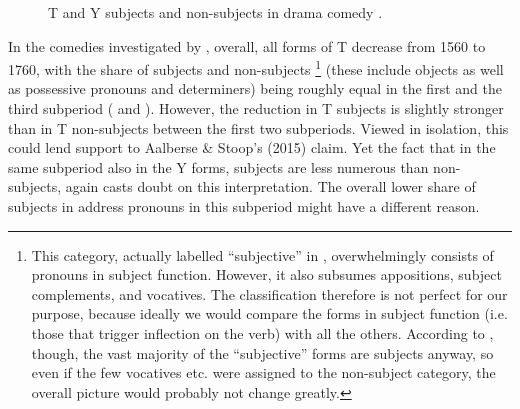 \documentclass[output=paper,hidelinks]{langscibook}
\begin{document}
\begin{figure}
\caption{T and Y subjects and non-subjects in drama comedy \citep[based on][320]{Walker2007}.\label{fig1}}
\end{figure}

In the comedies investigated by \citet{Walker2007}, overall, all forms of T decrease from 1560 to 1760, with the share of subjects and non-subjects \footnote{This category, actually labelled \enquote{subjective} in \citet{Walker2007}, overwhelmingly consists of pronouns in subject function. However, it also subsumes appositions, subject complements, and vocatives. The classification therefore is not perfect for our purpose, because ideally we would  compare the forms in subject function (i.e. those that trigger inflection on the verb) with all the others. According to \citet[260]{Walker2007}, though, the vast majority of the \enquote{subjective} forms are subjects anyway, so even if the few vocatives etc. were assigned to the non-subject category, the overall picture would probably not change greatly.}  (these include objects as well as possessive pronouns and determiners) being roughly equal in the first and the third subperiod ( and ). However, the reduction in T subjects is slightly stronger than in T non-subjects between the first two subperiods. Viewed in isolation, this could lend support to Aalberse \& Stoop’s (2015) claim. Yet the fact that in the same subperiod also in the Y forms, subjects are less numerous than non-subjects, again casts doubt on this interpretation. The overall lower share of subjects in address pronouns in this subperiod might have a different reason.
\end{document}
